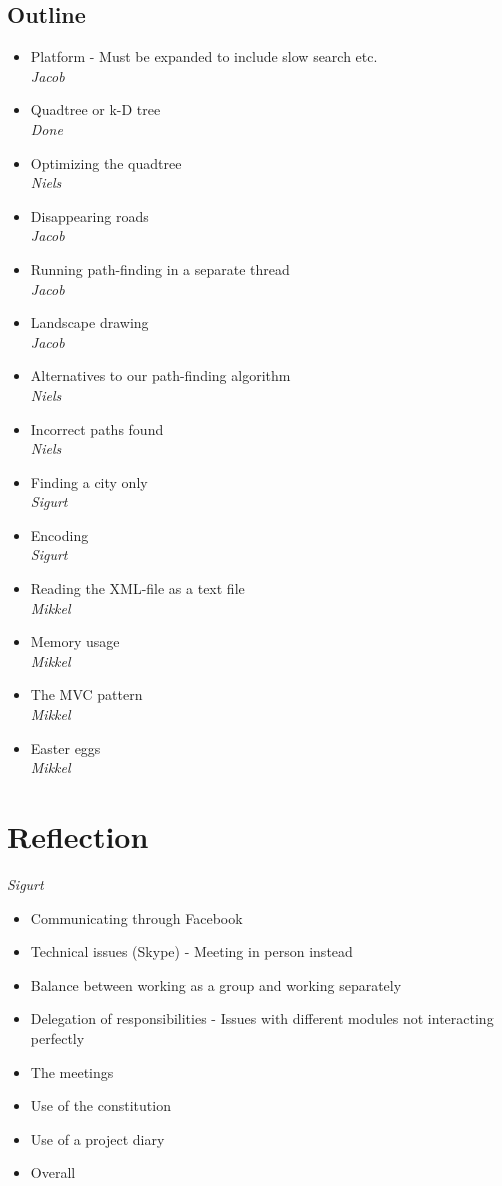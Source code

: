 \documentclass[a4paper,11pt]{article}
\begin{document}
\subsection{Outline}
\begin{itemize}
	\item Platform - Must be expanded to include slow search etc. \\
		\textsl{Jacob}
	\item Quadtree or k-D tree \\
		\textsl{Done}
	\item Optimizing the quadtree \\
		\textsl{Niels}
	\item Disappearing roads \\
		\textsl{Jacob}
	\item Running path-finding in a separate thread \\
		\textsl{Jacob}
	\item Landscape drawing \\
		\textsl{Jacob}
	\item Alternatives to our path-finding algorithm \\
		\textsl{Niels}
	\item Incorrect paths found \\
		\textsl{Niels}
	\item Finding a city only \\
		\textsl{Sigurt}
	\item Encoding \\
		\textsl{Sigurt}
	\item Reading the XML-file as a text file \\
		\textsl{Mikkel}
	\item Memory usage \\
		\textsl{Mikkel}
	\item The MVC pattern \\
		\textsl{Mikkel}
	\item Easter eggs \\
		\textsl{Mikkel}
\end{itemize}


\pagebreak
\section{Reflection}
\textsl{Sigurt}
\begin{itemize}
	\item Communicating through Facebook
	\item Technical issues (Skype) - Meeting in person instead
	\item Balance between working as a group and working separately
	\item Delegation of responsibilities - Issues with different modules not interacting perfectly
	\item The meetings
	\item Use of the constitution
	\item Use of a project diary
	\item Overall
\end{itemize}
\end{document}

